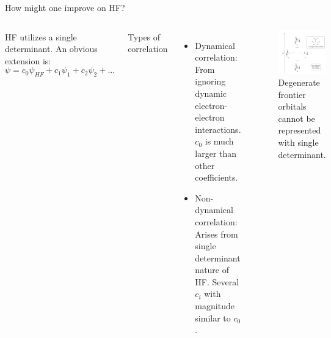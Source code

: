 \documentclass[aspectratio=169]{beamer}
\begin{document}
    \begin{frame}{How might one improve on HF?}
        \begin{columns}

            HF utilizes a single determinant. An obvious extension is:
            \begin{equation*}
                \psi = c_0 \psi_{HF} + c_1 \psi_{1} + c_2\psi_{2} + ...
            \end{equation*}

            Types of correlation
            \begin{itemize}
                \item Dynamical correlation: From ignoring dynamic electron-electron interactions. $c_0$ is much larger than other coefficients.
                \item Non-dynamical correlation: Arises from single determinant nature of HF. Several $c_i$ with magnitude similar to $c_0$.
            \end{itemize}
            \begin{figure}
                \centering
                \includegraphics[width=0.7\linewidth]{lectures/figures/3_degenerate_orbitals.png}
                \caption{Degenerate frontier orbitals cannot be represented with single determinant.}
            \end{figure}
        \end{columns}

    \end{frame}
\end{document}
